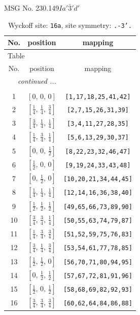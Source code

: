 \documentclass[fleqn,8pt]{jsarticle}
\begin{document}
\setcounter{MaxMatrixCols}{32}

\renewcommand{\tablename}{Table~}
\renewcommand{\figurename}{Figure~}
\begin{center}
\LARGE
MSG No. 230.149\quad$Ia'\bar{3}'d'$
\end{center}
\renewcommand{\arraystretch}{1.2}
\begin{longtable}{ccc}
\caption{Wyckoff site: {\tt 16a}, site symmetry: {\tt .-3'.}}
 \\
 \hline \hline
No. & position & mapping \\ \hline \endfirsthead

\multicolumn{2}{l}{\tablename\ \thetable{}} \\
 \hline \hline
No. & position & mapping \\ \hline \endhead

 \hline \hline
\multicolumn{2}{r}{\footnotesize\it continued ...} \\ \endfoot

 \hline \hline
\multicolumn{2}{r}{} \\ \endlastfoot

1 & $\left[ 0,\, 0,\, 0 \right]$ & {\tt [1,17,18,25,41,42]} \\ \hline
2 & $\left[ \frac{1}{4},\, \frac{1}{4},\, \frac{3}{4} \right]$ & {\tt [2,7,15,26,31,39]} \\ \hline
3 & $\left[ \frac{3}{4},\, \frac{1}{4},\, \frac{1}{4} \right]$ & {\tt [3,4,11,27,28,35]} \\ \hline
4 & $\left[ \frac{1}{4},\, \frac{3}{4},\, \frac{1}{4} \right]$ & {\tt [5,6,13,29,30,37]} \\ \hline
5 & $\left[ 0,\, 0,\, \frac{1}{2} \right]$ & {\tt [8,22,23,32,46,47]} \\ \hline
6 & $\left[ \frac{1}{2},\, 0,\, 0 \right]$ & {\tt [9,19,24,33,43,48]} \\ \hline
7 & $\left[ 0,\, \frac{1}{2},\, 0 \right]$ & {\tt [10,20,21,34,44,45]} \\ \hline
8 & $\left[ \frac{1}{4},\, \frac{1}{4},\, \frac{1}{4} \right]$ & {\tt [12,14,16,36,38,40]} \\ \hline
9 & $\left[ \frac{1}{2},\, \frac{1}{2},\, \frac{1}{2} \right]$ & {\tt [49,65,66,73,89,90]} \\ \hline
10 & $\left[ \frac{3}{4},\, \frac{3}{4},\, \frac{1}{4} \right]$ & {\tt [50,55,63,74,79,87]} \\ \hline
11 & $\left[ \frac{1}{4},\, \frac{3}{4},\, \frac{3}{4} \right]$ & {\tt [51,52,59,75,76,83]} \\ \hline
12 & $\left[ \frac{3}{4},\, \frac{1}{4},\, \frac{3}{4} \right]$ & {\tt [53,54,61,77,78,85]} \\ \hline
13 & $\left[ \frac{1}{2},\, \frac{1}{2},\, 0 \right]$ & {\tt [56,70,71,80,94,95]} \\ \hline
14 & $\left[ 0,\, \frac{1}{2},\, \frac{1}{2} \right]$ & {\tt [57,67,72,81,91,96]} \\ \hline
15 & $\left[ \frac{1}{2},\, 0,\, \frac{1}{2} \right]$ & {\tt [58,68,69,82,92,93]} \\ \hline
16 & $\left[ \frac{3}{4},\, \frac{3}{4},\, \frac{3}{4} \right]$ & {\tt [60,62,64,84,86,88]} \\
\end{longtable}
\end{document}
